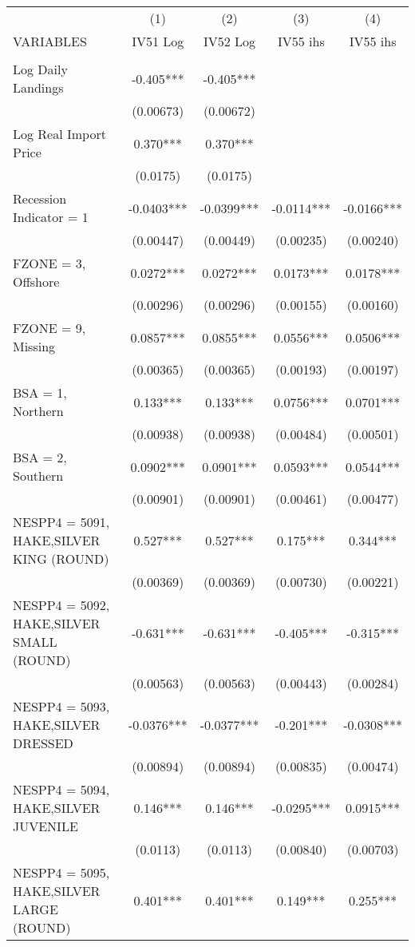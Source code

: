 \begin{tabular}{lcccc} \hline
 & (1) & (2) & (3) & (4) \\
VARIABLES & IV51 Log & IV52 Log & IV55 ihs & IV55 ihs \\ \hline
 &  &  &  &  \\
Log Daily Landings & -0.405*** & -0.405*** &  &  \\
 & (0.00673) & (0.00672) &  &  \\
Log Real Import Price & 0.370*** & 0.370*** &  &  \\
 & (0.0175) & (0.0175) &  &  \\
Recession Indicator = 1 & -0.0403*** & -0.0399*** & -0.0114*** & -0.0166*** \\
 & (0.00447) & (0.00449) & (0.00235) & (0.00240) \\
FZONE = 3, Offshore & 0.0272*** & 0.0272*** & 0.0173*** & 0.0178*** \\
 & (0.00296) & (0.00296) & (0.00155) & (0.00160) \\
FZONE = 9, Missing & 0.0857*** & 0.0855*** & 0.0556*** & 0.0506*** \\
 & (0.00365) & (0.00365) & (0.00193) & (0.00197) \\
BSA = 1, Northern & 0.133*** & 0.133*** & 0.0756*** & 0.0701*** \\
 & (0.00938) & (0.00938) & (0.00484) & (0.00501) \\
BSA = 2, Southern & 0.0902*** & 0.0901*** & 0.0593*** & 0.0544*** \\
 & (0.00901) & (0.00901) & (0.00461) & (0.00477) \\
NESPP4 = 5091, HAKE,SILVER KING (ROUND) & 0.527*** & 0.527*** & 0.175*** & 0.344*** \\
 & (0.00369) & (0.00369) & (0.00730) & (0.00221) \\
NESPP4 = 5092, HAKE,SILVER SMALL (ROUND) & -0.631*** & -0.631*** & -0.405*** & -0.315*** \\
 & (0.00563) & (0.00563) & (0.00443) & (0.00284) \\
NESPP4 = 5093, HAKE,SILVER DRESSED & -0.0376*** & -0.0377*** & -0.201*** & -0.0308*** \\
 & (0.00894) & (0.00894) & (0.00835) & (0.00474) \\
NESPP4 = 5094, HAKE,SILVER JUVENILE & 0.146*** & 0.146*** & -0.0295*** & 0.0915*** \\
 & (0.0113) & (0.0113) & (0.00840) & (0.00703) \\
NESPP4 = 5095, HAKE,SILVER LARGE (ROUND) & 0.401*** & 0.401*** & 0.149*** & 0.255*** \\

\end{tabular}
